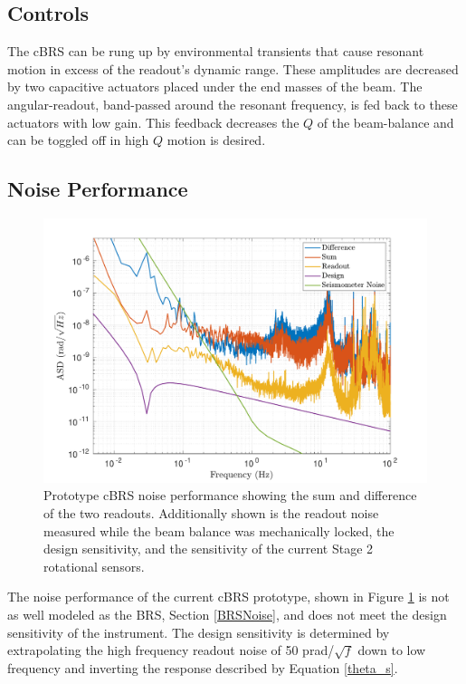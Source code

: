 \documentclass [12pt, proquest]{uwthesis}[2019]
\begin{document}
\subsection{Controls}

The cBRS can be rung up by environmental transients that cause resonant motion in excess of the readout's dynamic range. These amplitudes are decreased by two capacitive actuators placed under the end masses of the beam. The angular-readout, band-passed around the resonant frequency, is fed back to these actuators with low gain. This feedback decreases the $Q$ of the beam-balance and can be toggled off in high $Q$ motion is desired. 

\subsection{Noise Performance}

\begin{figure}[!h]
\begin{center}
 \includegraphics[width=\textwidth]{cBRS_Noise.pdf}
\caption[Prototype cBRS noise performance]{Prototype cBRS noise performance showing the sum and difference of the two readouts. Additionally shown is the readout noise measured while the beam balance was mechanically locked, the design sensitivity, and the sensitivity of the current Stage 2 rotational sensors.}
\label{cBRS_noise}
\end{center}
\end{figure}

The noise performance of the current cBRS prototype, shown in Figure \ref{cBRS_noise} is not as well modeled as the BRS, Section \ref{BRSNoise}, and does not meet the design sensitivity of the instrument. The design sensitivity is determined by extrapolating the high frequency readout noise of 50 prad/$\sqrt{f}$ down to low frequency and inverting the response described by Equation \ref{theta_s}.
\end{document}
